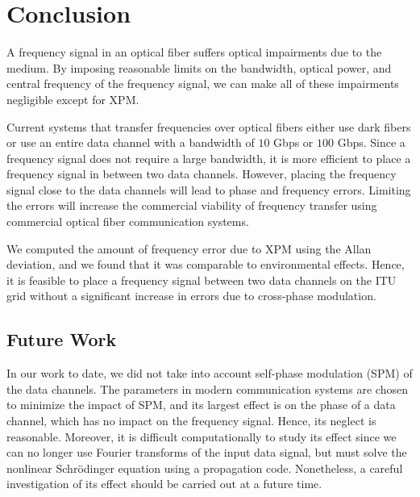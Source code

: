 \chapter{Conclusion}

A frequency signal in an optical fiber suffers optical impairments due to the medium. By imposing reasonable limits on the bandwidth, optical power, and central frequency of the frequency signal, we can make all of these impairments negligible except for XPM.

Current systems that transfer frequencies over optical fibers either use dark fibers or use an entire data channel with a bandwidth of $10$ Gbps or $100$ Gbps. Since a frequency signal does not require a large bandwidth, it is more efficient to place a frequency signal in between two data channels. However, placing the frequency signal close to the data channels will 
lead to phase and frequency errors. Limiting the errors will increase the commercial viability of frequency transfer using commercial optical fiber communication systems.

We computed the amount of frequency error due to XPM using the Allan deviation, and we found that it was comparable to environmental effects. Hence, it is feasible to place a frequency signal between two data channels on the ITU grid without a significant increase in errors due to cross-phase modulation.

\section{Future Work}

In our work to date, we did not take into account self-phase modulation (SPM) of the data channels. The parameters in modern communication systems are chosen to minimize the impact of SPM, and its largest effect is on the phase of a data channel, which has no impact on the frequency signal. Hence, its neglect is reasonable. Moreover, it is difficult computationally to study its effect since we can no longer use Fourier transforms of the input data signal, but must solve the nonlinear Schr{\"o}dinger equation using a propagation code. Nonetheless, a careful investigation of its effect should be carried out at a future time.